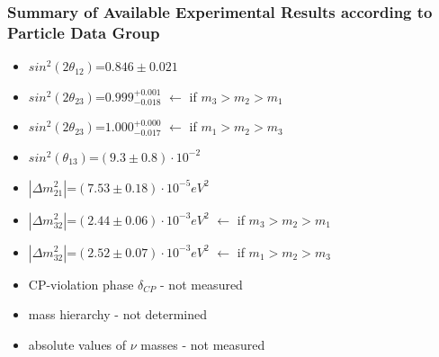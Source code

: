 \begin{frame}\frametitle{Summary of Available Experimental Results according to Particle Data Group \cite{ref_PDG}}
  \scriptsize
  \begin{itemize}
    \item $sin^2(2\theta_{12})$=$0.846\pm0.021$
    \item $sin^2(2\theta_{23})$=$0.999^{+0.001}_{-0.018}$ $\leftarrow$ if $m_3>m_2>m_1$
    \item $sin^2(2\theta_{23})$=$1.000^{+0.000}_{-0.017}$ $\leftarrow$ if $m_1>m_2>m_3$
    \item $sin^2(\theta_{13})$=$(9.3\pm0.8)\cdot10^{-2}$
    \item $|{\Delta}m^2_{21}|$=$(7.53\pm0.18) \cdot 10^{-5} eV^2$
    \item $|{\Delta}m^2_{32}|$=$(2.44\pm0.06) \cdot 10^{-3} eV^2$ $\leftarrow$ if $m_3>m_2>m_1$
    \item $|{\Delta}m^2_{32}|$=$(2.52\pm0.07) \cdot 10^{-3} eV^2$ $\leftarrow$ if $m_1>m_2>m_3$
    \item CP-violation phase $\delta_{CP}$ - {\large not measured}
    \item mass hierarchy - {\large not determined}
    \item absolute values of $\nu$ masses - {\large not measured}
  \end{itemize} 
\end{frame}

